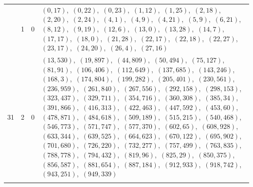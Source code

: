 \documentclass[11pt]{article}
\begin{document}
\begin{longtable}{@{}rrl>{\raggedright\arraybackslash}p{}@{}}
\addlinespace[3pt]
31 & 1 & $0$ & $(0,17)$,\allowbreak\ $(0,22)$,\allowbreak\ $(0,23)$,\allowbreak\ $(1,12)$,\allowbreak\ $(1,25)$,\allowbreak\ $(2,18)$,\allowbreak\ $(2,20)$,\allowbreak\ $(2,24)$,\allowbreak\ $(4,1)$,\allowbreak\ $(4,9)$,\allowbreak\ $(4,21)$,\allowbreak\ $(5,9)$,\allowbreak\ $(6,21)$,\allowbreak\ $(8,12)$,\allowbreak\ $(9,19)$,\allowbreak\ $(12,6)$,\allowbreak\ $(13,0)$,\allowbreak\ $(13,28)$,\allowbreak\ $(14,7)$,\allowbreak\ $(17,17)$,\allowbreak\ $(18,0)$,\allowbreak\ $(21,28)$,\allowbreak\ $(22,17)$,\allowbreak\ $(22,18)$,\allowbreak\ $(22,27)$,\allowbreak\ $(23,17)$,\allowbreak\ $(24,20)$,\allowbreak\ $(26,4)$,\allowbreak\ $(27,16)$\\
31 & 2 & $0$ & $(13,530)$,\allowbreak\ $(19,897)$,\allowbreak\ $(44,809)$,\allowbreak\ $(50,494)$,\allowbreak\ $(75,127)$,\allowbreak\ $(81,91)$,\allowbreak\ $(106,406)$,\allowbreak\ $(112,649)$,\allowbreak\ $(137,685)$,\allowbreak\ $(143,246)$,\allowbreak\ $(168,3)$,\allowbreak\ $(174,804)$,\allowbreak\ $(199,282)$,\allowbreak\ $(205,401)$,\allowbreak\ $(230,561)$,\allowbreak\ $(236,959)$,\allowbreak\ $(261,840)$,\allowbreak\ $(267,556)$,\allowbreak\ $(292,158)$,\allowbreak\ $(298,153)$,\allowbreak\ $(323,437)$,\allowbreak\ $(329,711)$,\allowbreak\ $(354,716)$,\allowbreak\ $(360,308)$,\allowbreak\ $(385,34)$,\allowbreak\ $(391,866)$,\allowbreak\ $(416,313)$,\allowbreak\ $(422,463)$,\allowbreak\ $(447,592)$,\allowbreak\ $(453,60)$,\allowbreak\ $(478,871)$,\allowbreak\ $(484,618)$,\allowbreak\ $(509,189)$,\allowbreak\ $(515,215)$,\allowbreak\ $(540,468)$,\allowbreak\ $(546,773)$,\allowbreak\ $(571,747)$,\allowbreak\ $(577,370)$,\allowbreak\ $(602,65)$,\allowbreak\ $(608,928)$,\allowbreak\ $(633,344)$,\allowbreak\ $(639,525)$,\allowbreak\ $(664,623)$,\allowbreak\ $(670,122)$,\allowbreak\ $(695,902)$,\allowbreak\ $(701,680)$,\allowbreak\ $(726,220)$,\allowbreak\ $(732,277)$,\allowbreak\ $(757,499)$,\allowbreak\ $(763,835)$,\allowbreak\ $(788,778)$,\allowbreak\ $(794,432)$,\allowbreak\ $(819,96)$,\allowbreak\ $(825,29)$,\allowbreak\ $(850,375)$,\allowbreak\ $(856,587)$,\allowbreak\ $(881,654)$,\allowbreak\ $(887,184)$,\allowbreak\ $(912,933)$,\allowbreak\ $(918,742)$,\allowbreak\ $(943,251)$,\allowbreak\ $(949,339)$\\
\addlinespace[3pt]

\end{longtable}
\end{document}

